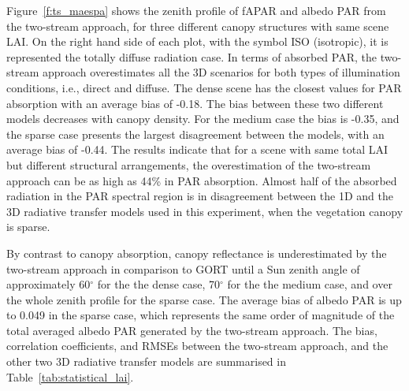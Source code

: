 \documentclass[a4paper,11pt]{report}
\begin{document}
Figure~\ref{f:ts_maespa} shows the zenith profile of fAPAR and albedo PAR from the two-stream approach, for three different canopy structures with same scene LAI. On the right hand side of each plot, with the symbol ISO (isotropic), it is represented the totally diffuse radiation case. In terms of absorbed PAR, the two-stream approach overestimates all the 3D scenarios for both types of illumination conditions, i.e., direct and diffuse. The dense scene has the closest values for PAR absorption with an average bias of -0.18. The bias between these two different models decreases with canopy density. For the medium case the bias is -0.35, and the sparse case presents the largest disagreement between the models, with an average bias of -0.44. The results indicate that for a scene with same total LAI but different structural arrangements, the overestimation of the two-stream approach can be as high as 44\% in PAR absorption. Almost half of the absorbed radiation in the PAR spectral region is in disagreement between the 1D and the 3D radiative transfer models used in this experiment, when the vegetation canopy is sparse.


By contrast to canopy absorption, canopy reflectance is underestimated by the two-stream approach in comparison to GORT until a Sun zenith angle of approximately 60$^{\circ}$ for the the dense case, 70$^{\circ}$ for the the medium case, and over the whole zenith profile for the sparse case. The average bias of albedo PAR is up to 0.049 in the sparse case, which represents the same order of magnitude of the total averaged albedo PAR generated by the two-stream approach. The bias, correlation coefficients, and RMSEs between the two-stream approach, and the other two 3D radiative transfer models are summarised in Table~\ref{tab:statistical_lai}.
\end{document}
